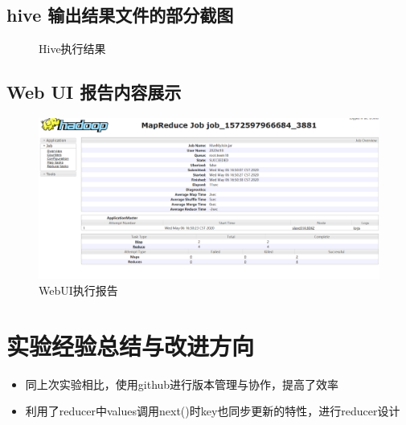 \documentclass[a4paper,UTF8]{article}
\numberwithin{equation}{section}
\begin{document}
\subsection{hive 输出结果文件的部分截图}
\begin{figure}[H]
	\centering
	\vfill
	
	\caption{Hive执行结果}
\end{figure}

\subsection{Web UI 报告内容展示}
\begin{figure}[H]
	\centering
	\includegraphics[width = 15cm]{job.PNG}
	\caption{WebUI执行报告}
\end{figure}
\section{实验经验总结与改进方向}
\begin{itemize}
	\item 同上次实验相比，使用github进行版本管理与协作，提高了效率
	\item 利用了reducer中values调用next()时key也同步更新的特性，进行reducer设计
\end{itemize}



\end{document}
